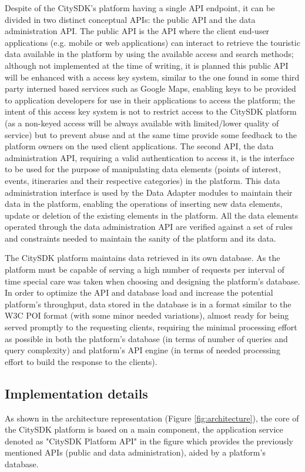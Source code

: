 \documentclass[times]{ettauth}
\begin{document}
Despite of the CitySDK's platform having a single API endpoint, it can be divided in two distinct conceptual APIs: the public API and the data administration API. The public API is the API where the client end-user applications (e.g. mobile or web applications) can interact to retrieve the touristic data available in the platform by using the available access and search methods; although not implemented at the time of writing, it is planned this public API will be enhanced with a access key system, similar to the one found in some third party interned based services such as Google Maps, enabling keys to be provided to application developers for use in their applications to access the platform; the intent of this access key system is not to restrict access to the CitySDK platform (as a non-keyed access will be always available with limited/lower quality of service) but to prevent abuse and at the same time provide some feedback to the platform owners on the used client applications. The second API, the data administration API, requiring a valid authentication to access it, is the interface to be used for the purpose of manipulating data elements (points of interest, events, itineraries and their respective categories) in the platform. This data administration interface is used by the Data Adapter modules to maintain their data in the platform, enabling the operations of inserting new data elements, update or deletion of the existing elements in the platform. All the data elements operated through the data administration API are verified against a set of rules and constraints needed to maintain the sanity of the platform and its data.

The CitySDK platform maintains data retrieved in its own database. As the platform must be capable of serving a high number of requests per interval of time special care was taken when choosing and designing the platform's database. In order to optimize the API and database load and increase the potential platform's throughput, data stored in the database is in a format similar to the W3C POI format (with some minor needed variations), almost ready for being served promptly to the requesting clients, requiring the minimal processing effort as possible in both the platform's database (in terms of number of queries and query complexity) and platform's API engine (in terms of needed processing effort to build the response to the clients).

\subsection{Implementation details}
As shown in the architecture representation (Figure \ref{fig:architecture}), the core of the CitySDK platform is based on a main component, the application service denoted as "CitySDK Platform API" in the figure which provides the previously mentioned APIs (public and data administration), aided by a platform's database. 
\end{document}
